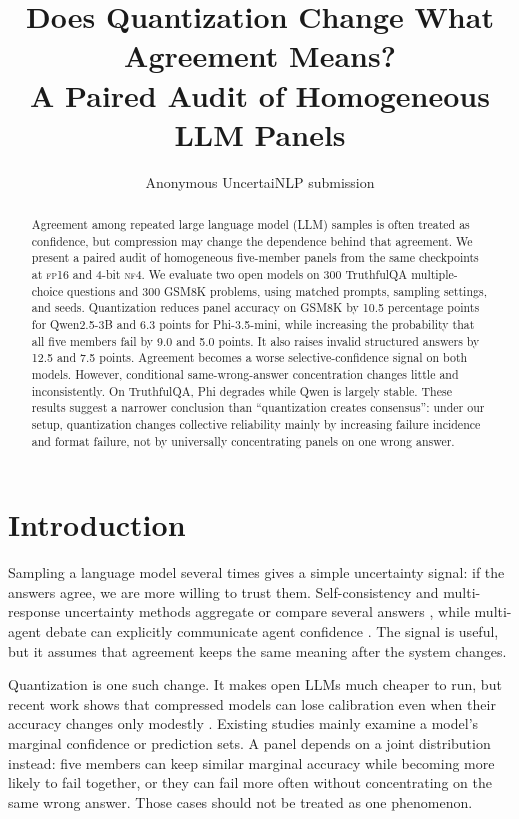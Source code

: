 \documentclass[11pt]{article}
\title{Does Quantization Change What Agreement Means?\\
A Paired Audit of Homogeneous LLM Panels}
\author{Anonymous UncertaiNLP submission}
\newcommand{\nf}{\textsc{nf4}}
\newcommand{\fp}{\textsc{fp16}}
\begin{document}
\maketitle

\begin{abstract}
Agreement among repeated large language model (LLM) samples is often treated as confidence, but compression may change the dependence behind that agreement. We present a paired audit of homogeneous five-member panels from the same checkpoints at \fp{} and 4-bit \nf{}. We evaluate two open models on 300 TruthfulQA multiple-choice questions and 300 GSM8K problems, using matched prompts, sampling settings, and seeds. Quantization reduces panel accuracy on GSM8K by 10.5 percentage points for Qwen2.5-3B and 6.3 points for Phi-3.5-mini, while increasing the probability that all five members fail by 9.0 and 5.0 points. It also raises invalid structured answers by 12.5 and 7.5 points. Agreement becomes a worse selective-confidence signal on both models. However, conditional same-wrong-answer concentration changes little and inconsistently. On TruthfulQA, Phi degrades while Qwen is largely stable. These results suggest a narrower conclusion than ``quantization creates consensus'': under our setup, quantization changes collective reliability mainly by increasing failure incidence and format failure, not by universally concentrating panels on one wrong answer.
\end{abstract}

\section{Introduction}

Sampling a language model several times gives a simple uncertainty signal: if the answers agree, we are more willing to trust them. Self-consistency and multi-response uncertainty methods aggregate or compare several answers \citep{wang2023selfconsistency,feng-etal-2025-rethinking,kruse-etal-2025-muse}, while multi-agent debate can explicitly communicate agent confidence \citep{yoffe-etal-2025-debunc}. The signal is useful, but it assumes that agreement keeps the same meaning after the system changes.

Quantization is one such change. It makes open LLMs much cheaper to run, but recent work shows that compressed models can lose calibration even when their accuracy changes only modestly \citep{zhong-etal-2025-quantized,tong2026compression}. Existing studies mainly examine a model's marginal confidence or prediction sets. A panel depends on a joint distribution instead: five members can keep similar marginal accuracy while becoming more likely to fail together, or they can fail more often without concentrating on the same wrong answer. Those cases should not be treated as one phenomenon.
\end{document}
